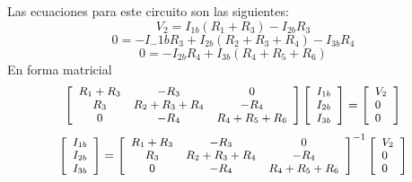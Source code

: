 \documentclass[twocolumn]{IEEEtran}
\begin{document}
\noindent
Las ecuaciones para este circuito son las siguientes:
\begin{equation}
 {V_2} = {I_{1b}}\left( {{R_1} + {R_3}} \right) - {I_{2b}}{R_3}
\end{equation}
\begin{equation}
 0 =  - {I_-{1b}}{R_3} + {I_{2b}}\left( {{R_2} + {R_3} + {R_4}} \right) - {I_{3b}}{R_4}
\end{equation}
\begin{equation}
 0 =  - {I_{2b}}{R_4} + {I_{3b}}\left( {{R_4} + {R_5} + {R_6}} \right)
\end{equation}
\noindent
En forma matricial
\begin{equation}
\footnotesize
 \left[ {\begin{array}{*{20}{c}}
   {{R_1} + {R_3}} & { - {R_3}} & 0  \\
   {{R_3}} & {{R_2} + {R_3} + {R_4}} & { - {R_4}}  \\
   0 & { - {R_4}} & {{R_4} + {R_5} + {R_6}}  \\
\end{array}} \right]\left[ \begin{array}{l}
 {I_{1b}} \\ 
 {I_{2b}} \\ 
 {I_{3b}} \\ 
 \end{array} \right] = \left[ \begin{array}{l}
 {V_2} \\ 
 0 \\ 
 0 \\ 
 \end{array} \right]
\label{mat3}
\end{equation}
\begin{equation}
\footnotesize
 \left[ \begin{array}{l}
 {I_{1b}} \\ 
 {I_{2b}} \\ 
 {I_{3b}} \\ 
 \end{array} \right] = {\left[ {\begin{array}{*{20}{c}}
   {{R_1} + {R_3}} & { - {R_3}} & 0  \\
   {{R_3}} & {{R_2} + {R_3} + {R_4}} & { - {R_4}}  \\
   0 & { - {R_4}} & {{R_4} + {R_5} + {R_6}}  \\
\end{array}} \right]^{ - 1}}\left[ \begin{array}{l}
 {V_2} \\ 
 0 \\ 
 0 \\ 
 \end{array} \right]
\label{mat4}
\end{equation}
\end{document}
